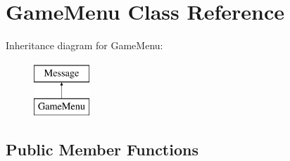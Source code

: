 \hypertarget{class_game_menu}{\section{Game\-Menu Class Reference}
\label{class_game_menu}
}
Inheritance diagram for Game\-Menu\-:\begin{figure}[H]
\begin{center}
\leavevmode
\includegraphics[height=2.000000cm]{class_game_menu}
\end{center}
\end{figure}
\subsection*{Public Member Functions}
